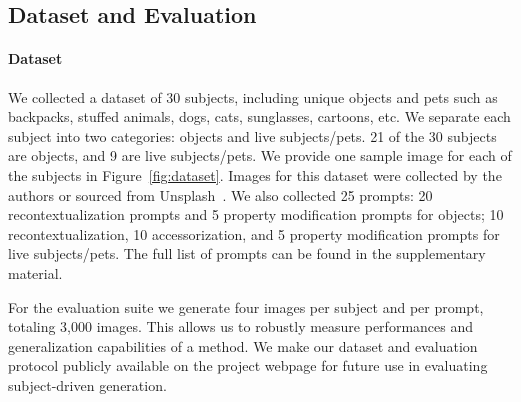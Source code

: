 \begin{table}[t]
\centering
{}
\caption{Subject fidelity and prompt fidelity user preference.
\label{table:user_study}}
\end{table}

\subsection{Dataset and Evaluation}

\paragraph{Dataset}
We collected a dataset of 30 subjects, including unique objects and pets such as backpacks, stuffed animals, dogs, cats, sunglasses, cartoons, etc. We separate each subject into two categories: objects and live subjects/pets. 21 of the 30 subjects are objects, and 9 are live subjects/pets. We provide one sample image for each of the subjects in Figure~\ref{fig:dataset}. Images for this dataset were collected by the authors or sourced from Unsplash~\cite{unsplash}.
We also collected 25 prompts: 20 recontextualization prompts and 5 property modification prompts for objects; 10 recontextualization, 10 accessorization, and 5 property modification prompts for live subjects/pets. The full list of prompts can be found in the supplementary material.

For the evaluation suite we generate four images per subject and per prompt, totaling 3,000 images. This allows us to robustly measure performances and generalization capabilities of a method. We make our dataset and evaluation protocol publicly available on the project webpage for future use in evaluating subject-driven generation.

